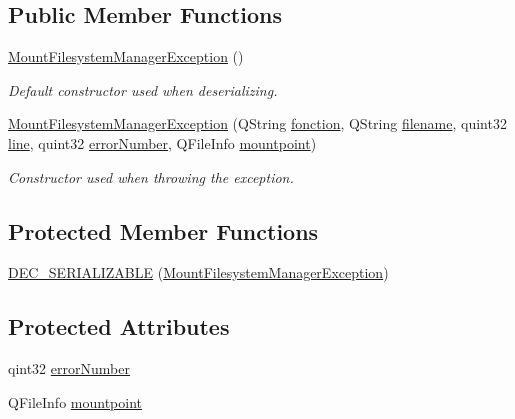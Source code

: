 \subsection*{Public Member Functions}
\begin{DoxyCompactItemize}
\item 
\hyperlink{class_gost_crypt_1_1_core_1_1_mount_filesystem_manager_exception_aac1c51de7d7c6e0936725860d4a54b35}{Mount\+Filesystem\+Manager\+Exception} ()
\begin{DoxyCompactList}\small\item\em Default constructor used when deserializing. \end{DoxyCompactList}\item 
\hyperlink{class_gost_crypt_1_1_core_1_1_mount_filesystem_manager_exception_ab543e90e4cfcf88eb519ed72d7cd599c}{Mount\+Filesystem\+Manager\+Exception} (Q\+String \hyperlink{class_gost_crypt_1_1_gost_crypt_exception_a29b8c93d5efbb1ff369107385725a939}{fonction}, Q\+String \hyperlink{class_gost_crypt_1_1_gost_crypt_exception_a749a12375f4ba9d502623b99d8252f38}{filename}, quint32 \hyperlink{class_gost_crypt_1_1_gost_crypt_exception_abf506d911f12a4e969eea500f90bd32c}{line}, quint32 \hyperlink{class_gost_crypt_1_1_core_1_1_mount_filesystem_manager_exception_a1fb5da5dbf91cfd3e664ffb9e2aee9ee}{error\+Number}, Q\+File\+Info \hyperlink{class_gost_crypt_1_1_core_1_1_mount_filesystem_manager_exception_aaa119fba81184433a1422a122be64ca0}{mountpoint})
\begin{DoxyCompactList}\small\item\em Constructor used when throwing the exception. \end{DoxyCompactList}\end{DoxyCompactItemize}
\subsection*{Protected Member Functions}
\begin{DoxyCompactItemize}
\item 
\hyperlink{class_gost_crypt_1_1_core_1_1_mount_filesystem_manager_exception_a69df7b67f199cde2284bf490d46251a3}{D\+E\+C\+\_\+\+S\+E\+R\+I\+A\+L\+I\+Z\+A\+B\+LE} (\hyperlink{class_gost_crypt_1_1_core_1_1_mount_filesystem_manager_exception}{Mount\+Filesystem\+Manager\+Exception})
\end{DoxyCompactItemize}
\subsection*{Protected Attributes}
\begin{DoxyCompactItemize}
\item 
qint32 \hyperlink{class_gost_crypt_1_1_core_1_1_mount_filesystem_manager_exception_a1fb5da5dbf91cfd3e664ffb9e2aee9ee}{error\+Number}
\item 
Q\+File\+Info \hyperlink{class_gost_crypt_1_1_core_1_1_mount_filesystem_manager_exception_aaa119fba81184433a1422a122be64ca0}{mountpoint}
\end{DoxyCompactItemize}


